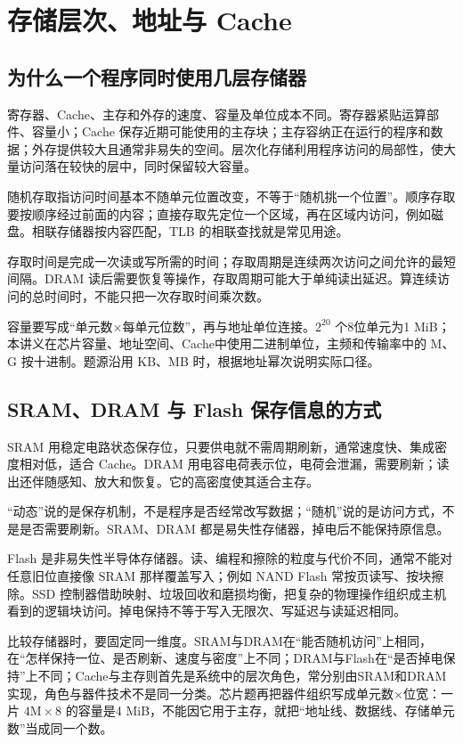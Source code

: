 \section{存储层次、地址与 Cache}\label{co-ch3}

\subsection{为什么一个程序同时使用几层存储器}\label{co-03-01}

寄存器、Cache、主存和外存的速度、容量及单位成本不同。寄存器紧贴运算部件、容量小；Cache 保存近期可能使用的主存块；主存容纳正在运行的程序和数据；外存提供较大且通常非易失的空间。层次化存储利用程序访问的局部性，使大量访问落在较快的层中，同时保留较大容量。

随机存取指访问时间基本不随单元位置改变，不等于``随机挑一个位置''。顺序存取要按顺序经过前面的内容；直接存取先定位一个区域，再在区域内访问，例如磁盘。相联存储器按内容匹配，TLB 的相联查找就是常见用途。

存取时间是完成一次读或写所需的时间；存取周期是连续两次访问之间允许的最短间隔。DRAM 读后需要恢复等操作，存取周期可能大于单纯读出延迟。算连续访问的总时间时，不能只把一次存取时间乘次数。

容量要写成``单元数×每单元位数''，再与地址单位连接。\(2^{20}\) 个8位单元为1 MiB；本讲义在芯片容量、地址空间、Cache中使用二进制单位，主频和传输率中的 M、G 按十进制。题源沿用 KB、MB 时，根据地址幂次说明实际口径。

\subsection{SRAM、DRAM 与 Flash 保存信息的方式}\label{co-03-02}

SRAM 用稳定电路状态保存位，只要供电就不需周期刷新，通常速度快、集成密度相对低，适合 Cache。DRAM 用电容电荷表示位，电荷会泄漏，需要刷新；读出还伴随感知、放大和恢复。它的高密度使其适合主存。

``动态''说的是保存机制，不是程序是否经常改写数据；``随机''说的是访问方式，不是是否需要刷新。SRAM、DRAM 都是易失性存储器，掉电后不能保持原信息。

Flash 是非易失性半导体存储器。读、编程和擦除的粒度与代价不同，通常不能对任意旧位直接像 SRAM 那样覆盖写入；例如 NAND Flash 常按页读写、按块擦除。SSD 控制器借助映射、垃圾回收和磨损均衡，把复杂的物理操作组织成主机看到的逻辑块访问。掉电保持不等于写入无限次、写延迟与读延迟相同。

比较存储器时，要固定同一维度。SRAM与DRAM在``能否随机访问''上相同，在``怎样保持一位、是否刷新、速度与密度''上不同；DRAM与Flash在``是否掉电保持''上不同；Cache与主存则首先是系统中的层次角色，常分别由SRAM和DRAM实现，角色与器件技术不是同一分类。芯片题再把器件组织写成单元数×位宽：一片 \(4\mathrm M\times8\) 的容量是4 MiB，不能因它用于主存，就把``地址线、数据线、存储单元数''当成同一个数。

